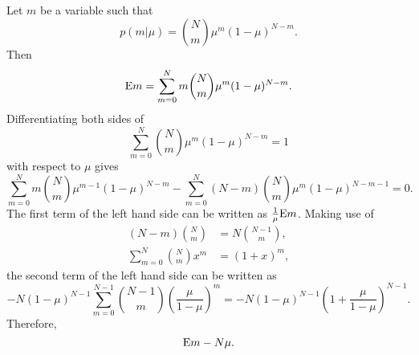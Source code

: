 \subsection{}
\label{2.4}
Let $m$ be a variable such that
%
\begin{equation}
p(m | \mu) = {N \choose m} \mu ^ m (1 - \mu) ^ {N - m}.
\end{equation}
%
Then
%
\begin{equation}
{\rm E} m = \sum_{m = 0}^{N} m {N \choose m} \mu ^ m (1 - \mu) ^ {N - m}.
\end{equation}
%
Differentiating both sides of 
%
\begin{equation}
\sum_{m = 0}^{N} {N \choose m} \mu ^ m (1 - \mu) ^ {N - m}  = 1
\end{equation}
%
with respect to $\mu$ gives
%
\begin{equation}
\sum_{m = 0}^{N} m {N \choose m} \mu ^ {m - 1} (1 - \mu) ^ {N - m} - \sum_{m = 0}^{N} (N - m) {N \choose m} \mu ^ m (1 - \mu) ^ {N - m - 1} = 0.
\end{equation}
%
The first term of the left hand side can be written as $\frac{1}{\mu} {\rm E} m$.
Making use of 
%
\begin{equation}
\begin{aligned}
(N - m) {N \choose m} &= N {N - 1 \choose m}, \\
\sum_{m = 0}^{N} {N \choose m} x ^ m &= (1 + x) ^ m,
\end{aligned}
\end{equation}
%
the second term of the left hand side can be written as
%
\begin{equation}
- N (1 - \mu) ^ {N - 1} \sum_{m = 0}^{N - 1} {N - 1 \choose m} \left( \frac{\mu}{1 - \mu} \right) ^ m = - N (1 - \mu) ^ {N - 1} \left( 1 + \frac{\mu}{1 - \mu} \right) ^ {N - 1}.
\end{equation}
%
Therefore,
%
\begin{equation}
{\rm E} m - N \mu. 
\end{equation}
%


























